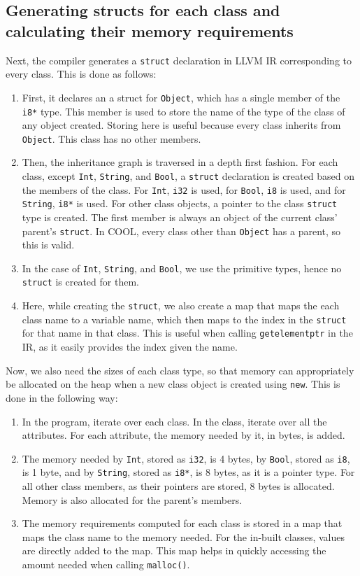 \documentclass{article}
\begin{document}
\subsection{Generating structs for each class and calculating their memory requirements}
Next, the compiler generates a \verb|struct| declaration in LLVM IR corresponding to every class. This is done as follows:
\begin{enumerate}
	\item First, it declares an a struct for \verb|Object|, which has a single member of the \verb|i8*| type. This member is used to store the name of the type of the class of any object created. Storing here is useful because every class inherits from \verb|Object|. This class has no other members.
	\item Then, the inheritance graph is traversed in a depth first fashion. For each class, except \verb|Int|, \verb|String|, and \verb|Bool|, a \verb|struct| declaration is created based on the members of the class. For \verb|Int|, \verb|i32| is used, for \verb|Bool|, \verb|i8| is used, and for \verb|String|, \verb|i8*| is used. For other class objects, a pointer to the class \verb|struct| type is created. The first member is always an object of the current class' parent's \verb|struct|. In COOL, every class other than \verb|Object| has a parent, so this is valid.
	\item In the case of \verb|Int|, \verb|String|, and \verb|Bool|, we use the primitive types, hence no \verb|struct| is created for them.
	\item Here, while creating the \verb|struct|, we also create a map that maps the each class name to a variable name, which then maps to the index in the \verb|struct| for that name in that class. This is useful when calling \verb|getelementptr| in the IR, as it easily provides the index given the name.
\end{enumerate}

Now, we also need the sizes of each class type, so that memory can appropriately be allocated on the heap when a new class object is created using \verb|new|. This is done in the following way:
\begin{enumerate}
	\item In the program, iterate over each class. In the class, iterate over all the attributes. For each attribute, the memory needed by it, in bytes, is added.
	\item The memory needed by \verb|Int|, stored as \verb|i32|, is 4 bytes, by \verb|Bool|, stored as \verb|i8|, is 1 byte, and by \verb|String|, stored as \verb|i8*|, is 8 bytes, as it is a pointer type. For all other class members, as their pointers are stored, 8 bytes is allocated. Memory is also allocated for the parent's members.
	\item The memory requirements computed for each class is stored in a map that maps the class name to the memory needed. For the in-built classes, values are directly added to the map. This map helps in quickly accessing the amount needed when calling \verb|malloc()|.
\end{enumerate}
\end{document}
